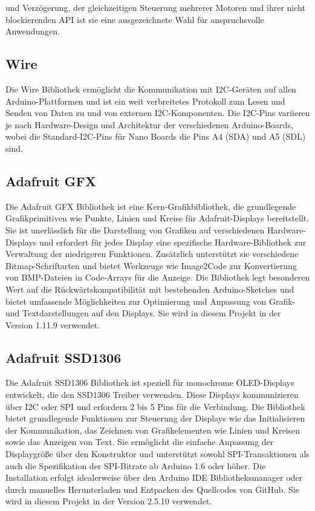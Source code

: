 {{{und Verzögerung, der gleichzeitigen Steuerung mehrerer Motoren und ihrer nicht blockierenden API ist sie eine ausgezeichnete Wahl für anspruchsvolle Anwendungen.\cite{McCauley:2024,McCauley:2024b}

\subsection {Wire}

Die Wire Bibliothek ermöglicht die Kommunikation mit I2C-Geräten auf allen Arduino-Plattformen und ist ein weit verbreitetes Protokoll zum Lesen und Senden von Daten zu und von externen I2C-Komponenten. Die I2C-Pins variieren je nach Hardware-Design und Architektur der verschiedenen Arduino-Boards, wobei die Standard-I2C-Pins für Nano Boards die Pins A4 (SDA) und A5 (SDL) sind.

\subsection{Adafruit GFX}

Die Adafruit GFX Bibliothek ist eine Kern-Grafikbibliothek, die grundlegende Grafikprimitiven wie Punkte, Linien und Kreise für Adafruit-Displays bereitstellt. Sie ist unerlässlich für die Darstellung von Grafiken auf verschiedenen Hardware-Displays und erfordert für jedes Display eine spezifische Hardware-Bibliothek zur Verwaltung der niedrigeren Funktionen. Zusätzlich unterstützt sie verschiedene Bitmap-Schriftarten und bietet Werkzeuge wie Image2Code zur Konvertierung von BMP-Dateien in Code-Arrays für die Anzeige. Die Bibliothek legt besonderen Wert auf die Rückwärtskompatibilität mit bestehenden Arduino-Sketches und bietet umfassende Möglichkeiten zur Optimierung und Anpassung von Grafik- und Textdarstellungen auf den Displays. Sie wird in diesem Projekt in der Version 1.11.9 verwendet.\cite{AdafruitIndustries:2024}

\subsection{Adafruit SSD1306}

Die Adafruit SSD1306 Bibliothek ist speziell für monochrome OLED-Displays entwickelt, die den SSD1306 Treiber verwenden. Diese Displays kommunizieren über I2C oder SPI und erfordern 2 bis 5 Pins für die Verbindung. Die Bibliothek bietet grundlegende Funktionen zur Steuerung der Displays wie das Initialisieren der Kommunikation, das Zeichnen von Grafikelementen wie Linien und Kreisen sowie das Anzeigen von Text. Sie ermöglicht die einfache Anpassung der Displaygröße über den Konstruktor und unterstützt sowohl SPI-Transaktionen als auch die Spezifikation der SPI-Bitrate ab Arduino 1.6 oder höher. Die Installation erfolgt idealerweise über den Arduino IDE Bibliotheksmanager oder durch manuelles Herunterladen und Entpacken des Quellcodes von GitHub. Sie wird in diesem Projekt in der Version 2.5.10 verwendet.\cite{AdafruitIndustries:2024b}

}}}
